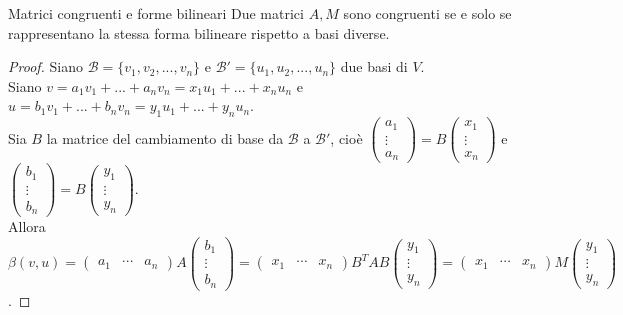 \documentclass[a4paper]{article}
\theoremstyle{definition}
\begin{document}
	\begin{teo}{Matrici congruenti e forme bilineari}{}
		Due matrici $A, M$ sono congruenti se e solo se rappresentano la stessa forma bilineare rispetto a basi diverse.
	\end{teo}
	\begin{proof}
		Siano $\mathcal{B} = \{v_1, v_2, ..., v_n\}$ e $\mathcal{B}' = \{u_1, u_2, ..., u_n\}$ due basi di $V$. \\
		Siano $v = a_1v_1 + ... + a_nv_n = x_1u_1 + ... + x_nu_n$ e $u = b_1v_1 + ... + b_nv_n = y_1u_1 + ... + y_nu_n$. \\
		Sia $B$ la matrice del cambiamento di base da $\mathcal{B}$ a $\mathcal{B}'$, cioè $\begin{pmatrix}
			a_1 \\
			\vdots \\
			a_n
		\end{pmatrix} = B \begin{pmatrix}
			x_1 \\
			\vdots \\
			x_n
		\end{pmatrix}$ e $\begin{pmatrix}
			b_1 \\
			\vdots \\
			b_n
		\end{pmatrix} = B \begin{pmatrix}
			y_1 \\
			\vdots \\
			y_n
		\end{pmatrix}$. \\
		Allora $\beta(v, u) = \begin{pmatrix}
			a_1 & \cdots & a_n
		\end{pmatrix}A \begin{pmatrix}
			b_1 \\
			\vdots \\
			b_n
		\end{pmatrix} = \begin{pmatrix}
			x_1 & \cdots & x_n
		\end{pmatrix}B^T A B \begin{pmatrix}
			y_1 \\
			\vdots \\
			y_n
		\end{pmatrix} = \begin{pmatrix}
			x_1 & \cdots & x_n
		\end{pmatrix} M \begin{pmatrix}
			y_1 \\
			\vdots \\
			y_n
		\end{pmatrix}$.
	\end{proof}
\end{document}
